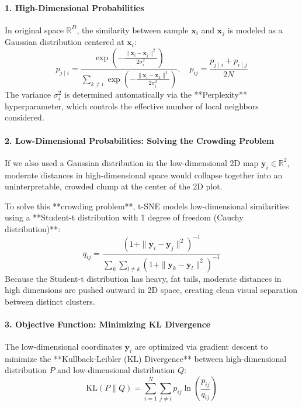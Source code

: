 \paragraph{1. High-Dimensional Probabilities}
In original space $\mathbb{R}^D$, the similarity between sample $\mathbf{x}_i$ and $\mathbf{x}_j$ is modeled as a Gaussian distribution centered at $\mathbf{x}_i$:
\begin{equation}
p_{j \mid i} = \frac{\exp\left(-\frac{\|\mathbf{x}_i - \mathbf{x}_j\|^2}{2\sigma_i^2}\right)}{\sum_{k \ne i} \exp\left(-\frac{\|\mathbf{x}_i - \mathbf{x}_k\|^2}{2\sigma_i^2}\right)}, \quad p_{ij} = \frac{p_{j \mid i} + p_{i \mid j}}{2N}\label{eq:tsne_high_p}
\end{equation}
The variance $\sigma_i^2$ is determined automatically via the **Perplexity** hyperparameter, which controls the effective number of local neighbors considered.

\paragraph{2. Low-Dimensional Probabilities: Solving the Crowding Problem}
If we also used a Gaussian distribution in the low-dimensional 2D map $\mathbf{y}_i \in \mathbb{R}^2$, moderate distances in high-dimensional space would collapse together into an uninterpretable, crowded clump at the center of the 2D plot.

To solve this **crowding problem**, t-SNE models low-dimensional similarities using a **Student-t distribution with 1 degree of freedom (Cauchy distribution)**:
\begin{equation}
q_{ij} = \frac{\left( 1 + \|\mathbf{y}_i - \mathbf{y}_j\|^2 \right)^{-1}}{\sum_{k} \sum_{l \ne k} \left( 1 + \|\mathbf{y}_k - \mathbf{y}_l\|^2 \right)^{-1}}\label{eq:tsne_low_q}
\end{equation}
Because the Student-t distribution has heavy, fat tails, moderate distances in high dimensions are pushed outward in 2D space, creating clean visual separation between distinct clusters.

\paragraph{3. Objective Function: Minimizing KL Divergence}
The low-dimensional coordinates $\mathbf{y}_i$ are optimized via gradient descent to minimize the **Kullback-Leibler (KL) Divergence** between high-dimensional distribution $P$ and low-dimensional distribution $Q$:
\begin{equation}
\text{KL}(P \parallel Q) = \sum_{i=1}^{N} \sum_{j \ne i} p_{ij} \ln\left( \frac{p_{ij}}{q_{ij}} \right)\label{eq:tsne_kl_loss}
\end{equation}

